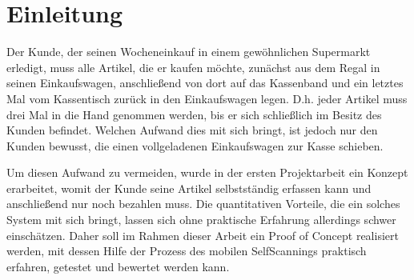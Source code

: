 \seKurzfassung[]




%
%
%
%
\seInhaltsverzeichnis[%
einrueckung=ja,
gliederungsebenen=4
]




%
%
%
%






%
\chapter{Einleitung}
Der Kunde, der seinen Wocheneinkauf in einem gewöhnlichen Supermarkt erledigt, muss alle Artikel, die er kaufen möchte, zunächst aus dem Regal in seinen Einkaufswagen, anschließend von dort auf das Kassenband und ein letztes Mal vom Kassentisch zurück in den Einkaufswagen legen. D.h. jeder Artikel muss drei Mal in die Hand genommen werden, bis er sich schließlich im Besitz des Kunden befindet. Welchen Aufwand dies mit sich bringt, ist jedoch nur den Kunden bewusst, die einen vollgeladenen Einkaufswagen zur Kasse schieben.

Um diesen Aufwand zu vermeiden, wurde in der ersten Projektarbeit ein Konzept erarbeitet, womit der Kunde seine Artikel selbstständig erfassen kann und anschließend nur noch bezahlen muss. Die quantitativen Vorteile, die ein solches System mit sich bringt, lassen sich ohne praktische Erfahrung allerdings schwer einschätzen. Daher soll im Rahmen dieser Arbeit ein Proof of Concept realisiert werden, mit dessen Hilfe der Prozess des mobilen SelfScannings praktisch erfahren, getestet und bewertet werden kann.

